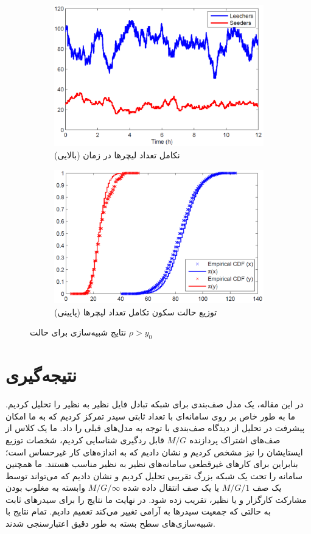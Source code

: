 \documentclass[11pt, oneside]{article}
\begin{document}
\begin{figure}[!ht]
	\centering
	\begin{subfigure}[b]{0.5\columnwidth}
		\centering
		\includegraphics[width=0.8\columnwidth]{resources/fig4_a.png}
		\caption{نکامل تعداد لیچرها در زمان (بالایی)}
	\end{subfigure}\hfill
	\begin{subfigure}[b]{0.5\columnwidth}
		\centering
		\includegraphics[width=0.8\columnwidth]{resources/fig4_b.png}
		\caption{توزیع حالت سکون تکامل تعداد لیچرها (پایینی)}
	\end{subfigure}
	\caption{نتایج شبیه‌سازی برای حالت $\rho>y_0$}
\end{figure}
\section{نتیجه‌گیری}
در این مقاله، یک مدل صف‌بندی برای شبکه تبادل فایل نظیر به نظیر را تحلیل کردیم. ما به طور خاص بر روی سامانه‌ای با تعداد ثابتی سیدر تمرکز کردیم که به ما امکان پیشرفت در تحلیل از دیدگاه صف‌بندی با توجه به مدل‌های قبلی را داد. ما یک کلاس از صف‌های اشتراک پردازنده $M/G$‌ قابل ردگیری  شناسایی کردیم، شخصات توزیع ایستایشان را نیز مشخص کردیم و نشان دادیم که به اندازه‌های کار غیرحساس است؛ بنابراین برای کارهای غیرقطعی سامانه‌های نظیر به نظیر مناسب هستند. ما همچنین سامانه را تحت یک شبکه بزرگ تقریبی تحلیل کردیم و نشان دادیم که می‌تواند توسط یک صف $M/G/1$ یا یک صف انتقال داده شده $M/G/\infty$ وابسته به مغلوب بودن مشارکت کارگزار و یا نظیر، تقریب زده شود. در نهایت ما نتایج را برای سیدرهای ثابت به حالتی که جمعیت سیدرها به آرامی تغییر می‌کند تعمیم دادیم. تمام نتایج با شبیه‌سازی‌های سطح بسته به طور دقیق اعتبارسنجی شدند.
\linespread{0.9}
\latinfont


\printendnotes[custom]
\end{document}
